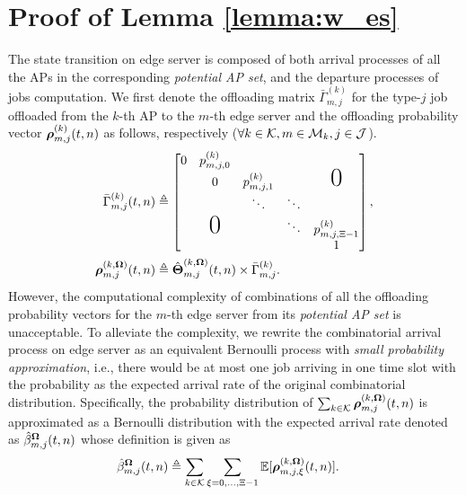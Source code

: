 \section{ Proof of Lemma \ref{lemma:w_es} }
\label{append_2}
The state transition on edge server is composed of both arrival processes of all the APs in the corresponding \emph{potential AP set}, and the departure processes of jobs computation.
We first denote the offloading matrix $\bar{\Gamma}^{(k)}_{m,j}$ for the type-$j$ job offloaded from the $k$-th AP to the $m$-th edge server and the offloading probability vector $\boldsymbol{\rho}^{(k)}_{m,j}({t,n})$ as follows, respectively ($\forall k\in\mathcal{K}, m\in\mathcal{M}_{k}, j\in\mathcal{J}$).
\begin{align}
    \bar{\Gamma}^{(k)}_{m,j}(t,n) &\define
    \begin{bmatrix}
        0 & p^{(k)}_{m,j,0} &                 &        &                     \\
        & 0                 & p^{(k)}_{m,j,1} &        & \text{\huge0}       \\
        &                   & \ddots          & \ddots &                     \\
        & \text{\huge0}     &                 & \ddots & p^{(k)}_{m,j,\Xi-1} \\
        &                   &                 &        & 1                   \\
    \end{bmatrix},
    \\
    \vecG{\rho}^{(k, \Policy)}_{m,j}({t,n}) &\define \hat{\vecG{\Theta}}^{(k, \Policy)}_{m,j}({t,n}) \times \bar{\Gamma}^{(k)}_{m,j}.
\end{align}
However, the computational complexity of combinations of all the offloading probability vectors for the $m$-th edge server from its \emph{potential AP set} is unacceptable.
To alleviate the complexity, we rewrite the combinatorial arrival process on edge server as an equivalent Bernoulli process with \emph{small probability approximation}, i.e., there would be at most one job arriving in one time slot with the probability as the expected arrival rate of the original combinatorial distribution.
Specifically, the probability distribution of $\sum_{k\in\mathcal{K}} \boldsymbol{\rho}^{(k, \boldsymbol{\Omega})}_{m,j}({t,n})$ is approximated as a Bernoulli distribution with the expected arrival rate denoted as $\hat{\beta}^{\boldsymbol{\Omega}}_{m,j}({t,n})$ whose definition is given as
\begin{align}
    \hat{\beta}^{\boldsymbol{\Omega}}_{m,j}({t,n}) &\triangleq \sum_{k\in\mathcal{K}} \sum_{\xi=0,\dots,\Xi-1} \mathbb{E}[\boldsymbol{\rho}^{(k, \boldsymbol{\Omega})}_{m,j,\xi}({t,n})].
    \label{eqn_0}
\end{align}

